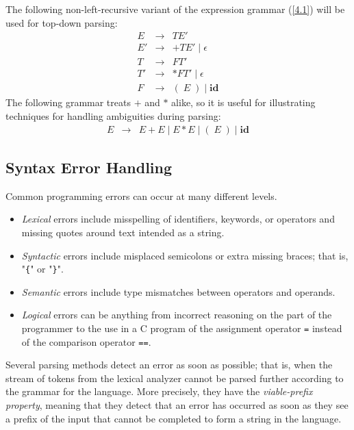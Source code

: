 \documentclass[12pt,a4paper,twoside,openany]{book}
\begin{document}
The following non-left-recursive variant of the expression grammar (\ref{4.1}) will be used for top-down parsing:
\begin{equation}
    \begin{array}{ccl}E&\rightarrow&TE'\\E'&\rightarrow&+TE'\;|\;\epsilon\\T&\rightarrow&FT'\\T'&\rightarrow&*FT'\;|\;\epsilon\\F&\rightarrow&(\;E\;)\;|\;\textbf{id}\end{array}
    \label{4.2}
\end{equation}
The following grammar treats $+$ and $*$ alike, so it is useful for illustrating techniques for handling ambiguities during parsing:
\begin{equation}
    \begin{array}{ccc}E&\rightarrow&E+E\;|\;E*E\;|\;(\;E\;)\;|\;\textbf{id}\end{array}
    \label{4.3}
\end{equation}

\subsection{Syntax Error Handling}

Common programming errors can occur at many different levels.
\begin{itemize}
    \item\textit{Lexical} errors include misspelling of identifiers, keywords, or operators and missing quotes around text intended as a string.
    \item\textit{Syntactic} errors include misplaced semicolons or extra missing braces; that is, "\verb|{|" or "\verb|}|".
    \item\textit{Semantic} errors include type mismatches between operators and operands.
    \item\textit{Logical} errors can be anything from incorrect reasoning on the part of the programmer to the use in a C program of the assignment operator \verb|=| instead of the comparison operator \verb|==|.
\end{itemize}

Several parsing methods detect an error as soon as possible; that is, when the stream of tokens from the lexical analyzer cannot be parsed further according to the grammar for the language. More precisely, they have the \textit{viable-prefix property}, meaning that they detect that an error has occurred as soon as they see a prefix of the input that cannot be completed to form a string in the language.
\end{document}
